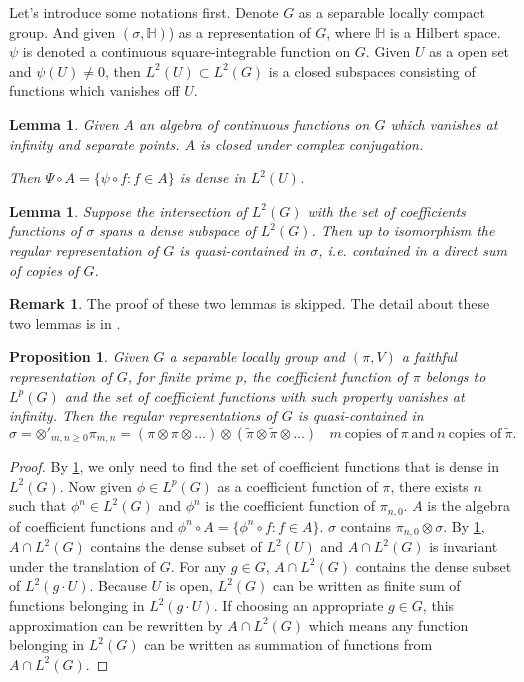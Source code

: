 \documentclass[12pt,a4paper,english]{article}
\theoremstyle{plain}
\newtheorem{lem}[thm]{Lemma}
\newtheorem{prop}[thm]{Proposition}
\theoremstyle{definition}
\newtheorem*{rem}{Remark}
\begin{document}
Let's introduce some notations first. Denote $G$ as a separable locally compact group. And given $(\sigma, \mathbb{H})$) as a representation of $G$, where $\mathbb{H}$ is a Hilbert space. $\psi$ is denoted a continuous square-integrable function on $G$. Given $U$ as a open set and $\psi(U)\not=0$, then $L^{2}(U)\subset L^{2}(G)$ is a closed subspaces consisting of functions which vanishes off $U$.

\begin{lem}\label{lem4}
Given $A$ an algebra of continuous functions on $G$ which vanishes at infinity and separate points. $A$ is closed under complex conjugation. 

Then $\Psi\circ A=\{\psi\circ f:f\in A\}$ is dense in $L^{2}(U)$.
\end{lem}
\begin{lem}\label{lem5}
Suppose the intersection of $L^{2}(G)$ with the set of coefficients functions of $\sigma$ spans a dense subspace of $L^{2}(G)$. Then up to isomorphism the regular representation of $G$ is quasi-contained in $\sigma$, i.e. contained in a direct sum of copies of $G$.
\end{lem}
\begin{rem}
The proof of these two lemmas is skipped. The detail about these two lemmas is in \cite{repka1978stone}.
\end{rem}
\begin{prop}
Given $G$ a separable locally group and $(\pi, V)$ a faithful representation of $G$, for finite prime $p$, the coefficient function of $\pi$ belongs to $L^{p}(G)$ and the set of coefficient functions with such property vanishes at infinity. Then the regular representations of $G$ is quasi-contained in 
\begin{equation*}
    \sigma=\otimes'_{m,n\geq 0}\pi_{m,n}=(\pi\otimes\pi\otimes...)\otimes (\tilde{\pi}\otimes\tilde{\pi}\otimes...)\ \ \ \ m\ \text{copies of}\ \pi\ \text{and}\ n\ \text{copies of}\ \tilde{\pi}.
\end{equation*}
\end{prop}
\begin{proof}
By \ref{lem5}, we only need to find the set of coefficient functions that is dense in $L^{2}(G)$. Now given $\phi\in L^{p}(G)$ as a coefficient function of $\pi$, there exists $n$ such that $\phi^{n}\in L^{2}(G)$ and 
$\phi^{n}$ is the coefficient function of $\pi_{n,0}$. $A$ is the algebra of coefficient functions and $\phi^{n}\circ A=\{\phi^{n}\circ f:f\in A\}$. $\sigma$ contains $\pi_{n,0}\otimes \sigma$. By \ref{lem4}, $A\cap L^{2}(G)$ contains the dense subset of $L^{2}(U)$ and $A\cap L^{2}(G)$ is invariant under the translation of $G$. For any $g\in G$, $A\cap L^{2}(G)$ contains the dense subset of $L^{2}(g\cdot U)$. Because $U$ is open, $L^{2}(G)$ can be written as finite sum of functions belonging in $L^{2}(g\cdot U)$. If choosing an appropriate $g\in G$, this approximation can be rewritten by $A\cap L^{2}(G)$ which means any function belonging in $L^{2}(G)$ can be written as summation of functions from $A\cap L^{2}(G)$.
\end{proof}
\end{document}
